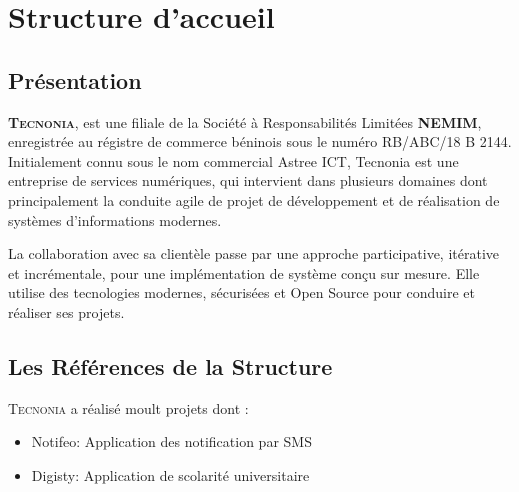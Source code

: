 
\chapter{Structure d'accueil} %

\section{Présentation}
\textbf{\textsc{Tecnonia}}, est une  filiale de la Société à Responsabilités Limitées \textbf{NEMIM}, enregistrée au régistre de commerce béninois sous le numéro RB/ABC/18 B 2144. Initialement connu sous le nom commercial Astree ICT, Tecnonia est une entreprise de services numériques, qui intervient dans plusieurs domaines dont principalement la conduite agile de projet de développement et de réalisation de systèmes d'informations modernes.

La collaboration avec sa clientèle passe par une approche participative, itérative et incrémentale, pour une implémentation de système conçu sur mesure.  Elle utilise des tecnologies modernes, sécurisées et Open Source pour conduire  et réaliser ses projets.

\section{Les Références de la Structure}
\textsc{Tecnonia} a réalisé moult projets dont :

\begin{itemize}
	\item Notifeo: Application des notification par SMS
	\item Digisty: Application de scolarité universitaire
\end{itemize}